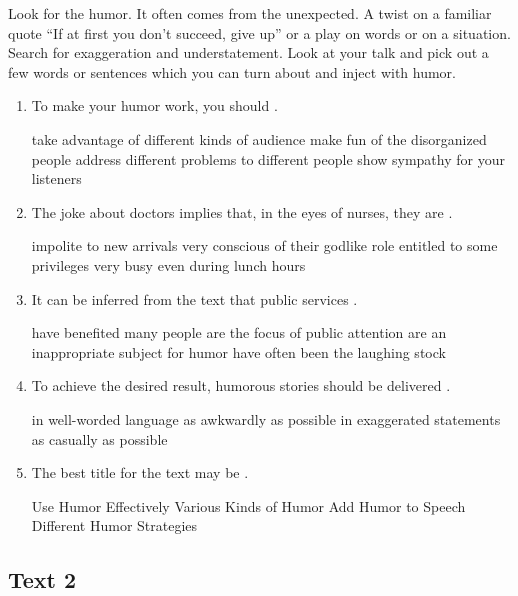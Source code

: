 Look for the humor. It often comes from the unexpected. A twist on a
familiar quote ``If at first you don't succeed, give up'' or a play on
words or on a situation. Search for exaggeration and understatement.
Look at your talk and pick out a few words or sentences which you can
turn about and inject with humor.

\begin{enumerate}[resume]
	\item
To make your humor work, you should \lineread.


\fourchoices
{take advantage of different kinds of audience}
{make fun of the disorganized people}
{address different problems to different people}
{show sympathy for your listeners}


\item
The joke about doctors implies that, in the eyes of nurses, they are \lineread.


\fourchoices
{impolite to new arrivals}
{very conscious of their godlike role}
{entitled to some privileges}
{very busy even during lunch hours}


\item
 It can be inferred from the text that public services \lineread.


\fourchoices
{have benefited many people}
{are the focus of public attention}
{are an inappropriate subject for humor}
{have often been the laughing stock}


\item
To achieve the desired result, humorous stories should be delivered \lineread.


\fourchoices
{in well-worded language}
{as awkwardly as possible}
{in exaggerated statements}
{as casually as possible}


\item
The best title for the text may be \lineread.


\fourchoices
{Use Humor Effectively}
{Various Kinds of Humor}
{Add Humor to Speech}
{Different Humor Strategies}

\end{enumerate}


\newpage
\subsection{Text 2}


